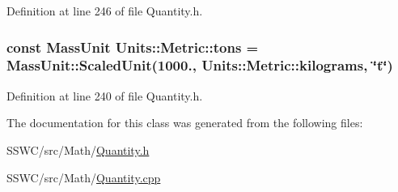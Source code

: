 Definition at line 246 of file Quantity.\+h.

\hypertarget{class_units_1_1_metric_a6795221af474ecd8907538c4ee3505ca}{
\subsubsection[{tons}]{\setlength{\rightskip}{0pt plus 5cm}const {\bf Mass\+Unit} Units\+::\+Metric\+::tons = {\bf Mass\+Unit\+::\+Scaled\+Unit}(1000., {\bf Units\+::\+Metric\+::kilograms}, \char`\"{}t\char`\"{})\hspace{0.3cm}{\ttfamily [static]}}}\label{class_units_1_1_metric_a6795221af474ecd8907538c4ee3505ca}


Definition at line 240 of file Quantity.\+h.



The documentation for this class was generated from the following files\+:\begin{DoxyCompactItemize}
\item 
S\+S\+W\+C/src/\+Math/\hyperlink{_quantity_8h}{Quantity.\+h}\item 
S\+S\+W\+C/src/\+Math/\hyperlink{_quantity_8cpp}{Quantity.\+cpp}\end{DoxyCompactItemize}
